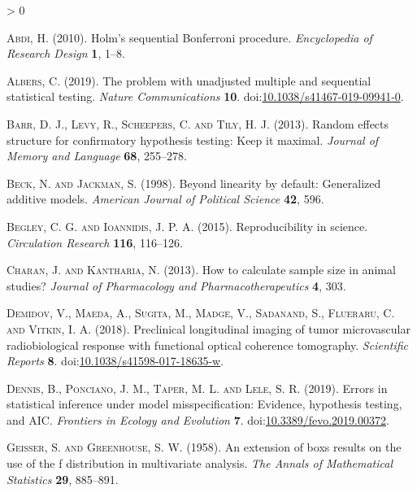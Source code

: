 \documentclass[
]{article}
\newlength{\cslhangindent}
\newenvironment{CSLReferences}[2] %
 {%
  \setlength{\parindent}{0pt}
  \ifodd #1 \everypar{\setlength{\hangindent}{\cslhangindent}}\ignorespaces\fi
  \ifnum #2 > 0
  \setlength{\parskip}{#2\baselineskip}
  \fi
 }%
 {}
\begin{document}
\hypertarget{refs}{}
\begin{CSLReferences}{1}{0}
\leavevmode\hypertarget{ref-abdi2010}{}%
\textsc{Abdi, H.} (2010). {Holm's sequential Bonferroni procedure}. \emph{Encyclopedia of Research Design} \textbf{1}, 1--8.

\leavevmode\hypertarget{ref-albers2019}{}%
\textsc{Albers, C.} (2019). The problem with unadjusted multiple and sequential statistical testing. \emph{Nature Communications} \textbf{10}. doi:\href{https://doi.org/10.1038/s41467-019-09941-0}{10.1038/s41467-019-09941-0}.

\leavevmode\hypertarget{ref-barr2013}{}%
\textsc{Barr, D. J., Levy, R., Scheepers, C. and Tily, H. J.} (2013). Random effects structure for confirmatory hypothesis testing: Keep it maximal. \emph{Journal of Memory and Language} \textbf{68}, 255--278.

\leavevmode\hypertarget{ref-beck1998}{}%
\textsc{Beck, N. and Jackman, S.} (1998). Beyond linearity by default: Generalized additive models. \emph{American Journal of Political Science} \textbf{42}, 596.

\leavevmode\hypertarget{ref-begley2015}{}%
\textsc{Begley, C. G. and Ioannidis, J. P. A.} (2015). Reproducibility in science. \emph{Circulation Research} \textbf{116}, 116--126.

\leavevmode\hypertarget{ref-charan2013}{}%
\textsc{Charan, J. and Kantharia, N.} (2013). How to calculate sample size in animal studies? \emph{Journal of Pharmacology and Pharmacotherapeutics} \textbf{4}, 303.

\leavevmode\hypertarget{ref-demidov2018}{}%
\textsc{Demidov, V., Maeda, A., Sugita, M., Madge, V., Sadanand, S., Flueraru, C. and Vitkin, I. A.} (2018). Preclinical longitudinal imaging of tumor microvascular radiobiological response with functional optical coherence tomography. \emph{Scientific Reports} \textbf{8}. doi:\href{https://doi.org/10.1038/s41598-017-18635-w}{10.1038/s41598-017-18635-w}.

\leavevmode\hypertarget{ref-dennis2019}{}%
\textsc{Dennis, B., Ponciano, J. M., Taper, M. L. and Lele, S. R.} (2019). Errors in statistical inference under model misspecification: Evidence, hypothesis testing, and {AIC}. \emph{Frontiers in Ecology and Evolution} \textbf{7}. doi:\href{https://doi.org/10.3389/fevo.2019.00372}{10.3389/fevo.2019.00372}.

\leavevmode\hypertarget{ref-geisser1958}{}%
\textsc{Geisser, S. and Greenhouse, S. W.} (1958). An extension of box{{}}s results on the use of the {{}}f{{}} distribution in multivariate analysis. \emph{The Annals of Mathematical Statistics} \textbf{29}, 885--891.


\end{CSLReferences}
\end{document}
